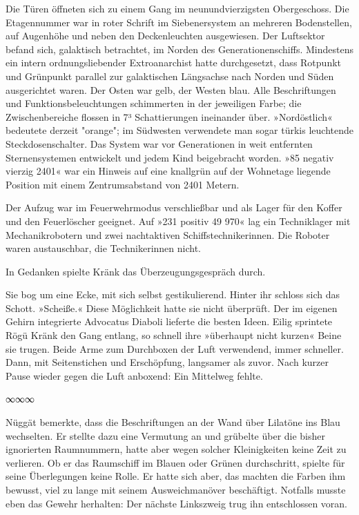 Die Türen öffneten sich zu einem Gang im neunundvierzigsten Obergeschoss. Die Etagennummer war in roter Schrift im Siebenersystem an mehreren Bodenstellen, auf Augenhöhe und neben den Deckenleuchten ausgewiesen. Der Luftsektor befand sich, galaktisch betrachtet, im Norden des Generationenschiffs. Mindestens ein intern ordnungsliebender Extroanarchist hatte durchgesetzt, dass Rotpunkt und Grünpunkt parallel zur galaktischen Längsachse nach Norden und Süden ausgerichtet waren. Der Osten war gelb, der Westen blau. Alle Beschriftungen und Funktionsbeleuchtungen schimmerten in der jeweiligen Farbe; die Zwischenbereiche flossen in 7³ Schattierungen ineinander über. »Nordöstlich« bedeutete derzeit "orange"; im Südwesten verwendete man sogar türkis leuchtende Steckdosenschalter. Das System war vor Generationen in weit entfernten Sternensystemen entwickelt und jedem Kind beigebracht worden. »85 negativ vierzig 2401« war ein Hinweis auf eine knallgrün auf der Wohnetage liegende Position mit einem Zentrumsabstand von 2401 Metern.

Der Aufzug war im Feuerwehrmodus verschließbar und als Lager für den Koffer und den Feuerlöscher geeignet. Auf »231 positiv 49 970« lag ein Techniklager mit Mechanikrobotern und zwei nachtaktiven Schiffstechnikerinnen. Die Roboter waren austauschbar, die Technikerinnen nicht.

In Gedanken spielte Kränk das Überzeugungsgespräch durch. 

Sie bog um eine Ecke, mit sich selbst gestikulierend.  Hinter ihr schloss sich das Schott. »Scheiße.« Diese Möglichkeit hatte sie nicht überprüft. Der im eigenen Gehirn integrierte Advocatus Diaboli lieferte die besten Ideen. Eilig sprintete Rögü Kränk den Gang entlang, so schnell ihre »überhaupt nicht kurzen« Beine sie trugen. Beide Arme zum Durchboxen der Luft verwendend, immer schneller. Dann, mit Seitenstichen und Erschöpfung, langsamer als zuvor. Nach kurzer Pause wieder gegen die Luft anboxend: Ein Mittelweg fehlte.

\begin{center}
∞∞∞
\end{center}

Nüggät bemerkte, dass die Beschriftungen an der Wand über Lilatöne ins Blau wechselten. Er stellte dazu eine Vermutung an und grübelte über die bisher ignorierten Raumnummern, hatte aber wegen solcher Kleinigkeiten keine Zeit zu verlieren. Ob er das Raumschiff im Blauen oder Grünen durchschritt, spielte für seine Überlegungen keine Rolle. Er hatte sich aber, das machten die Farben ihm bewusst, viel zu lange mit seinem Ausweichmanöver beschäftigt. Notfalls musste eben das Gewehr herhalten: Der nächste Linkszweig trug ihn entschlossen voran.


